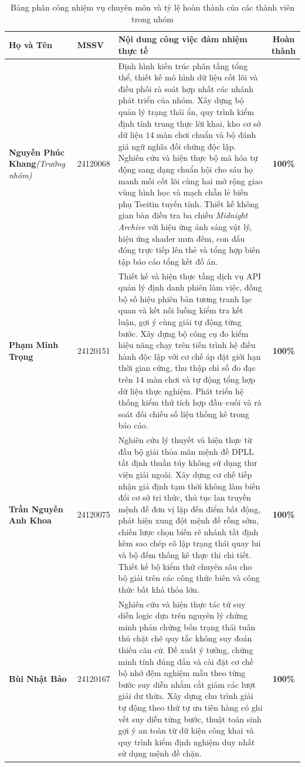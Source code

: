 \begin{table}[htbp]
\centering
\caption{%
    Bảng phân công nhiệm vụ chuyên môn và tỷ lệ hoàn thành của các thành viên
    trong nhóm}
\label{tab:team_contributions}
\scriptsize
\renewcommand{\arraystretch}{1.2}
\begin{tabularx}{\textwidth}{p{3.4cm} l >{\raggedright\arraybackslash}X c}
\toprule
\textbf{Họ và Tên} & \textbf{MSSV} & \textbf{Nội dung công việc đảm nhiệm thực tế} &
\textbf{Hoàn thành} \\
\midrule
\textbf{Nguyễn Phúc Khang}\newline \textit{(Trưởng nhóm)} & 24120068 &
Định hình kiến trúc phân tầng tổng thể, thiết kế mô hình dữ liệu cốt lõi và điều
phối rà soát hợp nhất các nhánh phát triển của nhóm. Xây dựng bộ quản lý trạng thái
ẩn, quy trình kiểm định tính trung thực lời khai, kho cơ sở dữ liệu $14$ màn chơi
chuẩn và bộ đánh giá ngữ nghĩa đối chứng độc lập. Nghiên cứu và hiện thực bộ mã
hóa tự động sang dạng chuẩn hội cho sáu họ manh mối cốt lõi cùng hai mở rộng giao
vùng hình học và mạch chẵn lẻ biến phụ Tseitin tuyến tính. Thiết kế không gian bàn
điều tra ba chiều \textit{Midnight Archive} với hiệu ứng ánh sáng vật lý, hiệu ứng
shader mưa đêm, con dấu đóng trực tiếp lên thẻ và tổng hợp biên tập báo cáo tổng
kết đồ án. & \textbf{100\%} \\
\midrule
\textbf{Phạm Minh Trọng} & 24120151 &
Thiết kế và hiện thực tầng dịch vụ API quản lý định danh phiên làm việc, đồng bộ số
hiệu phiên bản tương tranh lạc quan và kết nối luồng kiểm tra kết luận, gợi ý
cùng giải tự động từng bước. Xây dựng bộ công cụ đo kiểm hiệu năng chạy trên tiến
trình hệ điều hành độc lập với cơ chế áp đặt giới hạn thời gian cứng, thu thập chỉ
số đo đạc trên $14$ màn chơi và tự động tổng hợp dữ liệu thực nghiệm. Phát triển
hệ thống kiểm thử tích hợp đầu--cuối và rà soát đối chiếu số liệu thống kê trong
báo cáo. & \textbf{100\%} \\
\midrule
\textbf{Trần Nguyễn Anh Khoa} & 24120075 &
Nghiên cứu lý thuyết và hiện thực từ đầu bộ giải thỏa mãn mệnh đề DPLL tất định
thuần túy không sử dụng thư viện giải ngoài. Xây dựng cơ chế tiếp nhận giả định
tạm thời không làm biến đổi cơ sở tri thức, thủ tục lan truyền mệnh đề đơn vị lặp
đến điểm bất động, phát hiện xung đột mệnh đề rỗng sớm, chiến lược chọn biến rẽ
nhánh tất định kèm sao chép cô lập trạng thái quay lui và bộ đếm thống kê thực thi
chi tiết. Thiết kế bộ kiểm thử chuyên sâu cho bộ giải trên các công thức biên và
công thức bất khả thỏa lớn. & \textbf{100\%} \\
\midrule
\textbf{Bùi Nhật Bảo} & 24120167 &
Nghiên cứu và hiện thực tác tử suy diễn logic dựa trên nguyên lý chứng minh phản
chứng bốn trạng thái tuân thủ chặt chẽ quy tắc không suy đoán thiếu căn cứ. Đề xuất
ý tưởng, chứng minh tính đúng đắn và cài đặt cơ chế bộ nhớ đệm nghiệm mẫu theo
từng bước suy diễn nhằm cắt giảm các lượt giải dư thừa. Xây dựng chu trình giải tự
động theo thứ tự ưu tiên hàng có ghi vết suy diễn từng bước, thuật toán sinh gợi
ý an toàn từ dữ kiện công khai và quy trình kiểm định nghiệm duy nhất sử dụng mệnh
đề chặn. & \textbf{100\%} \\
\bottomrule
\end{tabularx}
\end{table}

